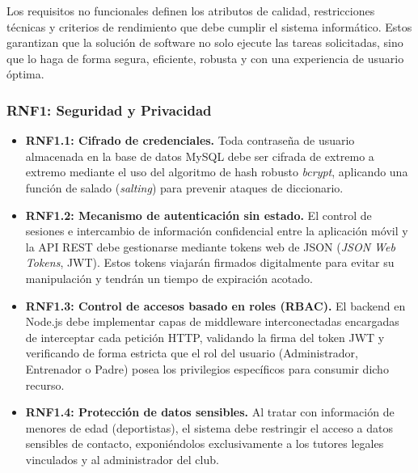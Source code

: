         Los requisitos no funcionales definen los atributos de calidad, restricciones técnicas y criterios de rendimiento que debe cumplir el sistema informático. Estos garantizan que la solución de software no solo ejecute las tareas solicitadas, sino que lo haga de forma segura, eficiente, robusta y con una experiencia de usuario óptima.

        \subsubsection*{RNF1: Seguridad y Privacidad}
        \begin{itemize}
            \item \textbf{RNF1.1: Cifrado de credenciales.} Toda contraseña de usuario almacenada en la base de datos MySQL debe ser cifrada de extremo a extremo mediante el uso del algoritmo de hash robusto \textit{bcrypt}, aplicando una función de salado (\textit{salting}) para prevenir ataques de diccionario.
            \item \textbf{RNF1.2: Mecanismo de autenticación sin estado.} El control de sesiones e intercambio de información confidencial entre la aplicación móvil y la API REST debe gestionarse mediante tokens web de JSON (\textit{JSON Web Tokens}, JWT). Estos tokens viajarán firmados digitalmente para evitar su manipulación y tendrán un tiempo de expiración acotado.
            \item \textbf{RNF1.3: Control de accesos basado en roles (RBAC).} El backend en Node.js debe implementar capas de middleware interconectadas encargadas de interceptar cada petición HTTP, validando la firma del token JWT y verificando de forma estricta que el rol del usuario (Administrador, Entrenador o Padre) posea los privilegios específicos para consumir dicho recurso.
            \item \textbf{RNF1.4: Protección de datos sensibles.} Al tratar con información de menores de edad (deportistas), el sistema debe restringir el acceso a datos sensibles de contacto, exponiéndolos exclusivamente a los tutores legales vinculados y al administrador del club.
        \end{itemize}

